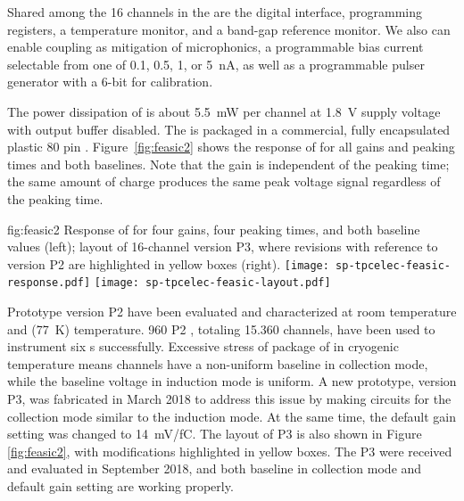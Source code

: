 Shared among the \num{16} channels in the   are 
the digital interface, programming registers, a temperature monitor, 
and a band-gap reference monitor. We also can enable  
coupling as mitigation of microphonics, a programmable bias current 
selectable from one of \num{0.1}, \num{0.5}, \num{1}, or \SI{5}{nA}, 
as well as a programmable pulser generator with a \num{6}-bit 
 for calibration. 

The power dissipation of   is about \SI{5.5}{mW} 
per channel at \SI{1.8}{V} supply voltage with output buffer disabled. 
The  is packaged in a commercial, fully encapsulated 
plastic \num{80} pin . Figure~\ref{fig:feasic2} shows the 
response of   for all gains and peaking times 
and both baselines. Note that the gain is independent of the peaking 
time; the same amount of charge produces the same peak voltage signal 
regardless of the peaking time.

\begin{dunefigure}
{fig:feasic2}
{Response of   for four gains, four peaking times, 
and both baseline values (left); layout of \num{16}-channel  
 version P3, where revisions with reference to version 
P2 are highlighted in yellow boxes (right).}
\texttt{[image: sp-tpcelec-feasic-response.pdf]}
\hspace{6mm}
\texttt{[image: sp-tpcelec-feasic-layout.pdf]}
\end{dunefigure}

Prototype version P2   have been evaluated and 
characterized at room temperature and \lntwo (\SI{77}{K}) temperature. 
\num{960} P2  , totaling \num{15,360} channels, 
have been used to instrument six  s successfully. 
Excessive stress of package of   in cryogenic 
temperature means  channels have a non-uniform baseline in 
collection mode, while the baseline  voltage in induction mode 
is uniform. A new prototype, version P3, was fabricated in March 2018 
to address this issue by making  circuits for the collection mode 
similar to the induction mode. At the same time, the default gain
setting was changed to \SI{14}{mV/fC}. The layout of P3  
 is also shown in Figure \ref{fig:feasic2}, with modifications 
highlighted in yellow boxes. The P3   were 
received and evaluated in September 2018, and both baseline in collection 
mode and default gain setting are working properly.


